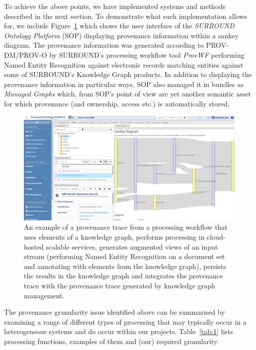 \documentclass[letterpaper,twocolumn,10pt]{article}
\begin{document}
To achieve the above points, we have implemented systems and methods described in the next section. To demonstrate what such implementation
allows for, we include Figure~\ref{fig:sankey} which shows the user interface of the \textit{SURROUND Ontology Platform} (SOP) displaying provenance 
information within a sankey diagram. The provenance information was generated according to PROV-DM/PROV-O by SURROUND's processing workflow tool 
\textit{ProvWF} performing Named Entity Recognition against electronic records matching entities against some of SURROUND's Knowledge Graph products. In addition to displaying the provenance information in particular ways, SOP also managed it in bundles as \textit{Managed Graphs} which, from SOP's point of view are yet another semantic asset for which provenance (and ownership, access etc.) is automatically stored.

\begin{figure}
  \begin{center}
    \includegraphics[width=\textwidth]{images/sankey.png}
  \end{center}
  \caption{\label{fig:sankey} An example of a provenance trace from a processing workflow that uses elements of a knowledge graph, performs processing in cloud-hosted scalable services, generates augmented views of an input stream (performing Named Entity Recognition on a document set and annotating with elements from the knowledge graph), persists the results in the knowledge graph and integrates the provenance trace with the provenance trace generated by knowledge graph management.}
  \end{figure}

The provenance granularity issue identified above can be summarised by examining a range of different types of processing that may typically 
occur in a heterogeneous systems and do occur within our projects. Table~\ref{tab:1} lists processing functions, examples of them and (our) required granularity.
\end{document}
